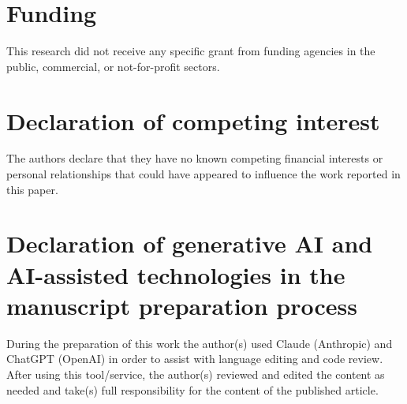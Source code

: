 \documentclass[a4paper,fleqn]{cas-dc}
\begin{document}
\section*{Funding}
This research did not receive any specific grant from funding agencies
in the public, commercial, or not-for-profit sectors.

\section*{Declaration of competing interest}
The authors declare that they have no known competing financial interests
or personal relationships that could have appeared to influence the work
reported in this paper.

\printcredits

\section*{Declaration of generative AI and AI-assisted technologies in the manuscript preparation process}
During the preparation of this work the author(s) used Claude (Anthropic) and ChatGPT (OpenAI) in order to assist with language editing and code review. After using this tool/service, the author(s) reviewed and edited the content as needed and take(s) full responsibility for the content of the published article.



\end{document}
